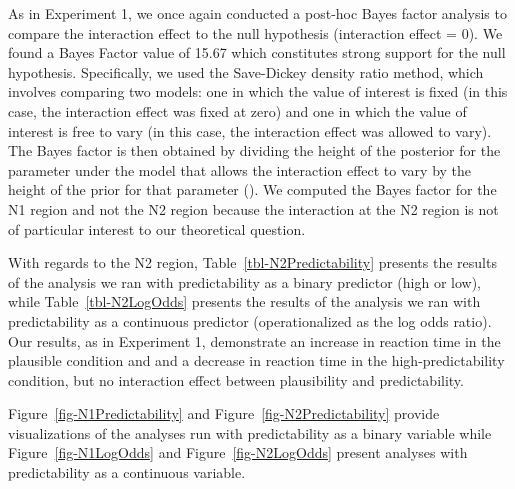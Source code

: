 \documentclass[
  12pt,
  letterpaper,
]{scrreport}
\begin{document}
As in Experiment 1, we once again conducted a post-hoc Bayes factor
analysis to compare the interaction effect to the null hypothesis
(interaction effect = 0). We found a Bayes Factor value of 15.67 which
constitutes strong support for the null hypothesis. Specifically, we
used the Save-Dickey density ratio method, which involves comparing two
models: one in which the value of interest is fixed (in this case, the
interaction effect was fixed at zero) and one in which the value of
interest is free to vary (in this case, the interaction effect was
allowed to vary). The Bayes factor is then obtained by dividing the
height of the posterior for the parameter under the model that allows
the interaction effect to vary by the height of the prior for that
parameter
(). We computed the Bayes factor for the N1 region and not the
N2 region because the interaction at the N2 region is not of particular
interest to our theoretical question.

With regards to the N2 region, Table~\ref{tbl-N2Predictability} presents
the results of the analysis we ran with predictability as a binary
predictor (high or low), while Table~\ref{tbl-N2LogOdds} presents the
results of the analysis we ran with predictability as a continuous
predictor (operationalized as the log odds ratio). Our results, as in
Experiment 1, demonstrate an increase in reaction time in the plausible
condition and and a decrease in reaction time in the high-predictability
condition, but no interaction effect between plausibility and
predictability.

Figure~\ref{fig-N1Predictability} and Figure~\ref{fig-N2Predictability}
provide visualizations of the analyses run with predictability as a
binary variable while Figure~\ref{fig-N1LogOdds} and
Figure~\ref{fig-N2LogOdds} present analyses with predictability as a
continuous variable.
\end{document}
